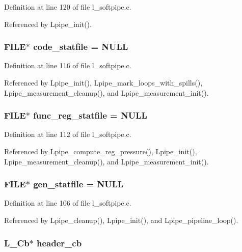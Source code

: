 Definition at line 120 of file l\_\-softpipe.c.

Referenced by Lpipe\_\-init().
\subsubsection{\setlength{\rightskip}{0pt plus 5cm}FILE$\ast$ \bf{code\_\-statfile} = NULL}\label{l__softpipe_8c_05e5e553ea7e96a23f4379f954ce70bb}




Definition at line 116 of file l\_\-softpipe.c.

Referenced by Lpipe\_\-init(), Lpipe\_\-mark\_\-loops\_\-with\_\-spills(), Lpipe\_\-measurement\_\-cleanup(), and Lpipe\_\-measurement\_\-init().
\subsubsection{\setlength{\rightskip}{0pt plus 5cm}FILE$\ast$ \bf{func\_\-reg\_\-statfile} = NULL}\label{l__softpipe_8c_66928bb443a445b2b093b1082d083379}




Definition at line 112 of file l\_\-softpipe.c.

Referenced by Lpipe\_\-compute\_\-reg\_\-pressure(), Lpipe\_\-init(), Lpipe\_\-measurement\_\-cleanup(), and Lpipe\_\-measurement\_\-init().
\subsubsection{\setlength{\rightskip}{0pt plus 5cm}FILE$\ast$ \bf{gen\_\-statfile} = NULL}\label{l__softpipe_8c_bfb992b8633f7de2f771384a01c7411e}




Definition at line 106 of file l\_\-softpipe.c.

Referenced by Lpipe\_\-cleanup(), Lpipe\_\-init(), and Lpipe\_\-pipeline\_\-loop().
\subsubsection{\setlength{\rightskip}{0pt plus 5cm}L\_\-Cb$\ast$ \bf{header\_\-cb}}\label{l__softpipe_8c_91e84fa9645e4d3beb7b8b6c150da74b}




